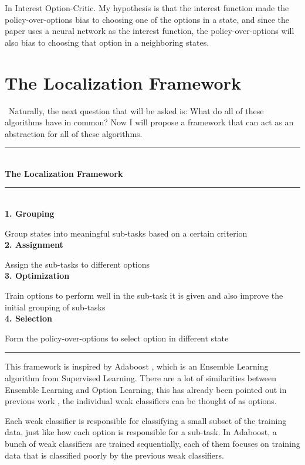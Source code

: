 \documentclass{article}
\begin{document}
	\normalsize{\quad In Interest Option-Critic. My hypothesis is that the interest function made the policy-over-options bias to choosing one of the options in a state, and since the paper uses a neural network as the interest function, the policy-over-options will also bias to choosing that option in a neighboring states.}
	\section{The Localization Framework}
	\qquad \ Naturally, the next question that will be asked is: What do all of these algorithms have in common? Now I will propose a framework that can act as an abstraction for all of these algorithms.\vspace{0.1in}\\
	\rule{420pt}{2pt}\vspace{0.1in}\\
	\large{\bfseries{The Localization Framework}}\\
	\rule{420pt}{0.4pt}\\
	\normalsize{\bfseries{1. Grouping}}
	
	\normalsize{Group states into meaningful sub-tasks based on a certain criterion}\\
	{\bfseries{2. Assignment}}
	
	\normalsize{Assign the sub-tasks to different options}\\
	{\bfseries{3. Optimization}}
	
	\normalsize{Train options to perform well in the sub-task it is given and also improve the initial grouping of sub-tasks}\\
	{\bfseries{4. Selection}}
	
	\normalsize{Form the policy-over-options to select option in different state}\\
	\rule{420pt}{2pt}\vspace{0.1in}
	
	\quad This framework is inspired by Adaboost \cite{adaboost}, which is an Ensemble Learning algorithm from Supervised Learning. There are a lot of similarities between Ensemble Learning and Option Learning, this has already been pointed out in previous work \cite{zhang2018ace}, the individual weak classifiers can be thought of as options.
	
	\quad Each weak classifier is responsible for classifying a small subset of the training data, just like how each option is responsible for a sub-task. In Adaboost, a bunch of weak classifiers are trained sequentially, each of them focuses on training data that is classified poorly by the previous weak classifiers.
	
\end{document}
